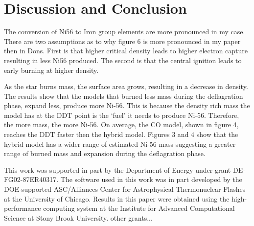 \documentclass[iop,apj]{emulateapj}
\begin{document}
\section{Discussion and Conclusion}


The conversion of Ni56 to Iron group elements are more pronounced in my
case. There are two assumptions as to why figure 6 is more pronounced
in my paper then in Dons.  First is that higher critical density leads
to higher electron capture resulting in less Ni56 produced. The second
is that the central ignition leads to early burning at higher density.


As the star burns mass, the surface area grows, resulting in a decrease
in density. The results show that the models that burned less mass during
the deflagration phase, expand less, produce more Ni-56. This is because
the density rich mass the model has at the DDT point is the ‘fuel’
it needs to produce Ni-56. Therefore, the more mass, the more Ni-56. On
average, the CO model, shown in figure 4, reaches the DDT faster then
the hybrid model. Figures 3 and 4 show that the hybrid model has a wider
range of estimated Ni-56 mass suggesting a greater range of burned mass
and expansion during the deflagration phase.




This work was supported in part by the Department of Energy under
grant DE-FG02-87ER40317. The software used in this work was in part
developed by the DOE-supported ASC/Alliances Center for Astrophysical
Thermonuclear Flashes at the University of Chicago. Results in this
paper were obtained using the high-performance computing system at the
Institute for Advanced Computational Science at Stony Brook
University.  other grants...



\end{document}
